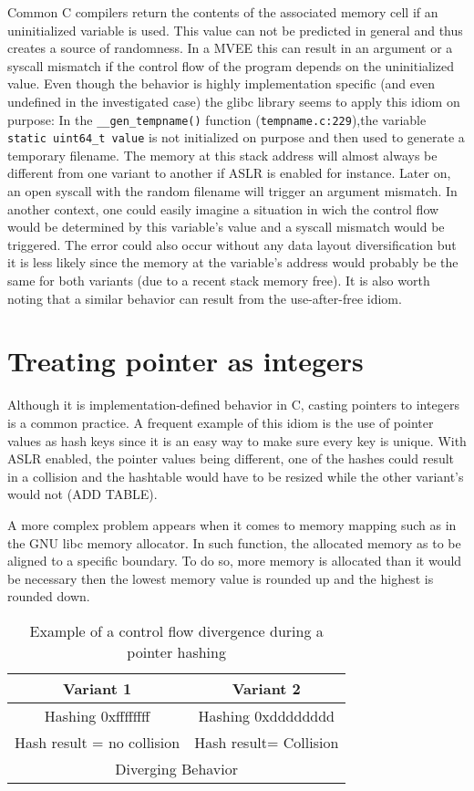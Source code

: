 \documentclass[english]{enstaPRE}
\begin{document}
Common C compilers return the contents of the associated memory cell if an uninitialized variable is used.
This value can not be predicted in general and thus creates a source of randomness. In a MVEE this can result in an argument or a syscall mismatch if the
control flow of the program depends on the uninitialized value.
Even though the behavior is highly implementation specific (and even undefined in the investigated case) the glibc library seems to apply 
this idiom on purpose: In the \texttt{\_\_gen\_tempname()} function (\texttt{tempname.c:229}),the variable \texttt{static uint64\_t value}
is not initialized on purpose and then used to generate a temporary filename.
The memory at this stack address will almost always be different from one variant to another if ASLR is enabled for instance.
Later on, an open syscall with the random filename will trigger an argument mismatch. In another context, one could easily imagine
a situation in wich the control flow would be determined by this variable’s value and a syscall mismatch would be triggered.
The error could also occur without any data layout diversification but it is less likely since the memory at the variable’s address would
probably be the same for both variants (due to a recent stack memory free).
It is also worth noting that a similar behavior can result from the use-after-free idiom. \\


\section{Treating pointer as integers}

Although it is implementation-defined behavior in C, casting pointers to integers is a common practice.
A frequent example of this idiom is the use of pointer values as hash keys since it is an easy way to make sure every key is unique. With ASLR enabled,
the pointer values being different, one of the hashes could result in a collision and the hashtable would have to be resized while
the other variant’s would not (ADD TABLE).

A more complex problem appears when it comes to memory mapping such as in the GNU libc memory allocator.
In such function, the allocated memory as to be aligned to a specific boundary. To do so, more memory is allocated than it would be 
necessary then the lowest memory value is rounded up and the highest is rounded down. \\

\begin{table}[t]
 \centering
 \def\arraystretch{1.5}
 \begin{tabular}{c|c}
 Variant 1 & Variant 2 \\\hline
 Hashing 0xffffffff &  Hashing 0xdddddddd \\
 Hash result = no collision & Hash result= Collision \\
  \multicolumn{2}{c}{Diverging Behavior}\\
\end{tabular}
\caption{Example of a control flow divergence during a pointer hashing}
\label{tab:hashdiv}
\end{table}
\end{document}
